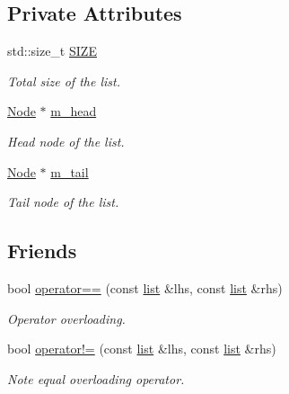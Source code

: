 \subsection*{Private Attributes}
\begin{DoxyCompactItemize}
\item 
std\+::size\+\_\+t \hyperlink{classsc_1_1list_a8bd70921cedd595d66b9c756576c607d}{S\+I\+ZE}
\begin{DoxyCompactList}\small\item\em Total size of the list. \end{DoxyCompactList}\item 
\hyperlink{structsc_1_1list_1_1_node}{Node} $\ast$ \hyperlink{classsc_1_1list_ae6e1456ccc49b257a34dc075e3bdaf68}{m\+\_\+head}
\begin{DoxyCompactList}\small\item\em Head node of the list. \end{DoxyCompactList}\item 
\hyperlink{structsc_1_1list_1_1_node}{Node} $\ast$ \hyperlink{classsc_1_1list_a5c06e83502191b3a59003a61abef42c7}{m\+\_\+tail}
\begin{DoxyCompactList}\small\item\em Tail node of the list. \end{DoxyCompactList}\end{DoxyCompactItemize}
\subsection*{Friends}
\begin{DoxyCompactItemize}
\item 
bool \hyperlink{classsc_1_1list_a6b11eba79282ca1e3292b3e16bc74062}{operator==} (const \hyperlink{classsc_1_1list}{list} \&lhs, const \hyperlink{classsc_1_1list}{list} \&rhs)
\begin{DoxyCompactList}\small\item\em Operator overloading. \end{DoxyCompactList}\item 
bool \hyperlink{classsc_1_1list_ae31168758d84aaaad62ef080ccb91bac}{operator!=} (const \hyperlink{classsc_1_1list}{list} \&lhs, const \hyperlink{classsc_1_1list}{list} \&rhs)
\begin{DoxyCompactList}\small\item\em Note equal overloading operator. \end{DoxyCompactList}\end{DoxyCompactItemize}


